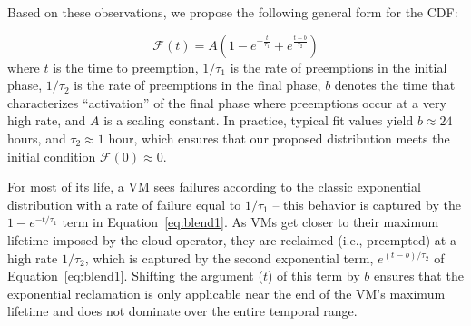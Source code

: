 %
%

Based on these observations, we propose the following general form for the CDF:

\vspace*{\subsecspace}
\begin{equation}
  \label{eq:blend1}
  \boxed{
  \mathscr{F}\left(t\right) = A\left(1-e^{-\frac{t}{\tau_1}} + e^{\frac{t-b}{\tau_2}}\right)}
  \end{equation}
\noindent where $t$ is the time to preemption, $1/\tau_1$ is the rate of preemptions in the initial phase, $1/\tau_2$ is the rate of preemptions in the final phase, $b$ denotes the time that characterizes ``activation'' of the final phase where preemptions occur at a very high rate, and $A$ is a scaling constant.
In practice, typical fit values yield $b \approx 24$ hours, and $\tau_2 \approx 1$ hour, which ensures that our proposed distribution meets the initial condition $\mathscr{F}(0) \approx 0$.


For most of its life, a VM sees failures according to the classic exponential distribution with a rate of failure equal to $1/\tau_1$ -- this behavior is captured by the $1-e^{-t/\tau_1}$ term in Equation~\ref{eq:blend1}. 
As VMs get closer to their maximum lifetime imposed by the cloud operator, they are reclaimed (i.e., preempted) at a high rate $1/\tau_2$, which is captured by the second exponential term, $e^{(t-b)/\tau_2}$ of Equation~\ref{eq:blend1}. 
Shifting the argument ($t$) of this term by $b$ ensures that the exponential reclamation is only applicable near the end of the VM's maximum lifetime and does not dominate over the entire temporal range. 

